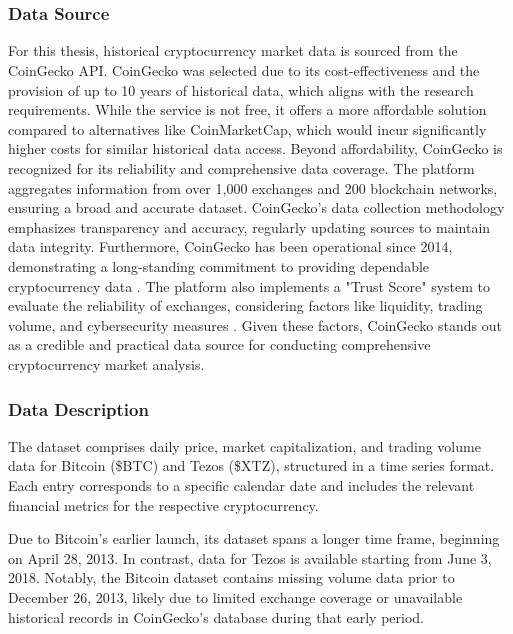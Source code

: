 \chapter{}%
\label{ch:datacollection}

\subsection{Data Source}

For this thesis, historical cryptocurrency market data is sourced from the CoinGecko API. CoinGecko was selected due to its cost-effectiveness and the provision of up to 10 years of historical data, which aligns with the research requirements. While the service is not free, it offers a more affordable solution compared to alternatives like CoinMarketCap, which would incur significantly higher costs for similar historical data access.
Beyond affordability, CoinGecko is recognized for its reliability and comprehensive data coverage. The platform aggregates information from over 1,000 exchanges and 200 blockchain networks, ensuring a broad and accurate dataset. CoinGecko's data collection methodology emphasizes transparency and accuracy, regularly updating sources to maintain data integrity. \textcite{CoinGeckoRollendXavier}
Furthermore, CoinGecko has been operational since 2014, demonstrating a long-standing commitment to providing dependable cryptocurrency data . The platform also implements a "Trust Score" system to evaluate the reliability of exchanges, considering factors like liquidity, trading volume, and cybersecurity measures .
Given these factors, CoinGecko stands out as a credible and practical data source for conducting comprehensive cryptocurrency market analysis.

\subsection{Data Description}

The dataset comprises daily price, market capitalization, and trading volume data for Bitcoin (\$BTC) and Tezos (\$XTZ), structured in a time series format. Each entry corresponds to a specific calendar date and includes the relevant financial metrics for the respective cryptocurrency.

Due to Bitcoin's earlier launch, its dataset spans a longer time frame, beginning on April 28, 2013. In contrast, data for Tezos is available starting from June 3, 2018. Notably, the Bitcoin dataset contains missing volume data prior to December 26, 2013, likely due to limited exchange coverage or unavailable historical records in CoinGecko’s database during that early period.

